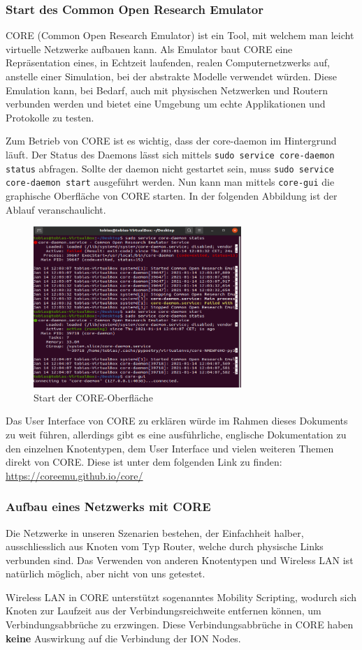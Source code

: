 \documentclass{article}
\begin{document}
\subsubsection{Start des Common Open Research Emulator}
CORE (Common Open Research Emulator) ist ein Tool, mit welchem man leicht virtuelle Netzwerke aufbauen kann. Als Emulator baut CORE eine Repräsentation eines, in Echtzeit laufenden, realen Computernetzwerks auf, anstelle einer Simulation, bei der abstrakte Modelle verwendet würden. Diese Emulation kann, bei Bedarf, auch mit physischen Netzwerken und Routern verbunden werden und bietet eine Umgebung um echte Applikationen und Protokolle zu testen. \cite{core-docs}\par
Zum Betrieb von CORE ist es wichtig, dass der core-daemon im Hintergrund läuft. Der Status des Daemons lässt sich mittels \texttt{sudo service core-daemon status} abfragen. Sollte der daemon nicht gestartet sein, muss \texttt{sudo service core-daemon start} ausgeführt werden. Nun kann man mittels \texttt{core-gui} die graphische Oberfläche von CORE starten. In der folgenden Abbildung ist der Ablauf veranschaulicht.\par
\begin{figure}[ht]
\centering
\includegraphics[width=0.7\textwidth]{core-start}
\caption{Start der CORE-Oberfläche}
\end{figure}
Das User Interface von CORE zu erklären würde im Rahmen dieses Dokuments zu weit führen, allerdings gibt es eine ausführliche, englische Dokumentation zu den einzelnen Knotentypen, dem User Interface und vielen weiteren Themen direkt von CORE. Diese ist unter dem folgenden Link zu finden: \url{https://coreemu.github.io/core/}\par
\subsubsection{Aufbau eines Netzwerks mit CORE}
Die Netzwerke in unseren Szenarien bestehen, der Einfachheit halber, ausschliesslich aus Knoten vom Typ Router, welche durch physische Links verbunden sind. Das Verwenden von anderen Knotentypen und Wireless LAN ist natürlich möglich, aber nicht von uns getestet.\par
Wireless LAN in CORE unterstützt sogenanntes Mobility Scripting, wodurch sich Knoten zur Laufzeit aus der Verbindungsreichweite entfernen können, um Verbindungsabbrüche zu erzwingen. Diese Verbindungsabbrüche in CORE haben \textbf{keine} Auswirkung auf die Verbindung der ION Nodes.
\end{document}
